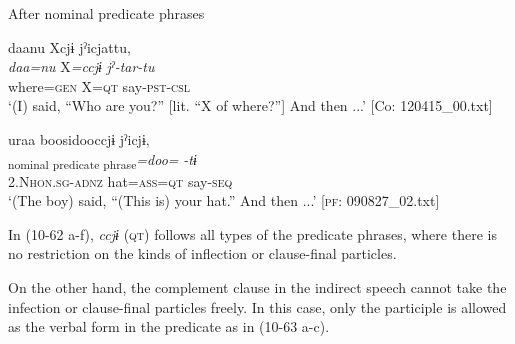 \begin{xlist}
  \exi{} After nominal predicate phrases

  \ex  %
      \glll    daanu  Xcjɨ  jˀicjattu,\\
      \textit{daa=nu}  X\textit{=ccjɨ}  \textit{jˀ-tar-tu}\\
      where=\textsc{gen}  X=\textsc{qt}  say-\textsc{pst}-\textsc{csl}\\
      \glt       ‘(I) said, “Who are you?” [lit. “X of where?”] And then ...’ [Co: 120415\_00.txt]

  \ex %
      \glll    uraa  {\textbar}boosi{\textbar}dooccjɨ  jˀicjɨ,\\
      [\textit{ura-a}  \textit{boosi}]\textsubscript{nominal predicate phrase}\textit{=doo=}  \textit{-tɨ}\\
      2.N\textsc{hon}.\textsc{sg}-\textsc{adnz}  hat=\textsc{ass}=\textsc{qt}  say-\textsc{seq}\\
      \glt       ‘(The boy) said, “(This is) your hat.” And then ...’ [\textsc{pf}: 090827\_02.txt]
  \end{xlist}
\z

In (10-62 a-f), \textit{ccjɨ} (\textsc{qt}) follows all types of the predicate phrases, where there is no restriction on the kinds of inflection or clause-final particles.

On the other hand, the complement clause in the indirect speech cannot take the infection or clause-final particles freely. In this case, only the participle is allowed as the verbal form in the predicate as in (10-63 a-c).

